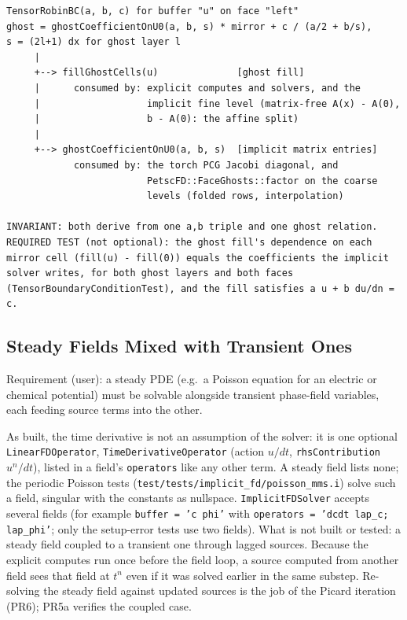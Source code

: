 \documentclass[11pt]{article}
\newenvironment{schematic}{%
  \begin{tcolorbox}[breakable, colback=codebg, colframe=gray!40, boxrule=0.4pt, arc=1mm, left=4mm, right=4mm, top=2mm, bottom=2mm]
  \ttfamily\footnotesize
}{%
  \end{tcolorbox}
}
\begin{document}
\begin{schematic}
\begin{verbatim}
TensorRobinBC(a, b, c) for buffer "u" on face "left"
ghost = ghostCoefficientOnU0(a, b, s) * mirror + c / (a/2 + b/s),
s = (2l+1) dx for ghost layer l
     |
     +--> fillGhostCells(u)              [ghost fill]
     |      consumed by: explicit computes and solvers, and the
     |                   implicit fine level (matrix-free A(x) - A(0),
     |                   b - A(0): the affine split)
     |
     +--> ghostCoefficientOnU0(a, b, s)  [implicit matrix entries]
            consumed by: the torch PCG Jacobi diagonal, and
                         PetscFD::FaceGhosts::factor on the coarse
                         levels (folded rows, interpolation)

INVARIANT: both derive from one a,b triple and one ghost relation.
REQUIRED TEST (not optional): the ghost fill's dependence on each
mirror cell (fill(u) - fill(0)) equals the coefficients the implicit
solver writes, for both ghost layers and both faces
(TensorBoundaryConditionTest), and the fill satisfies a u + b du/dn = c.
\end{verbatim}
\end{schematic}

\subsection{Steady Fields Mixed with Transient Ones}
\label{sec:steady-mixing}

Requirement (user): a steady PDE (e.g.\ a Poisson equation for an electric
or chemical potential) must be solvable alongside transient phase-field
variables, each feeding source terms into the other.

As built, the time derivative is not an assumption of the solver: it is one
optional \texttt{LinearFDOperator}, \texttt{TimeDerivativeOperator} (action
$u/dt$, \texttt{rhsContribution} $u^n/dt$), listed in a field's
\texttt{operators} like any other term. A steady field lists none; the
periodic Poisson tests (\texttt{test/tests/implicit\_fd/poisson\_mms.i}) solve
such a field, singular with the constants as nullspace. \texttt{ImplicitFDSolver}
accepts several fields (for example \texttt{buffer = 'c phi'} with
\texttt{operators = 'dcdt lap\_c; lap\_phi'}; only the setup-error tests use
two fields). What is not built or tested:
a steady field coupled to a transient one through lagged sources. Because
the explicit computes run once before the field loop, a source computed from
another field sees that field at $t^n$ even if it was solved earlier in the
same substep. Re-solving the steady field against updated sources is the job
of the Picard iteration (PR6); PR5a verifies the coupled case.
\end{document}
